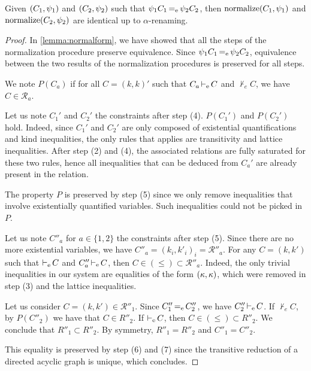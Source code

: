 \begin{lemma}[Uniqueness]
  Given $(C_1,\mathrm{\psi}_1)$ and $(C_2,\mathrm{\psi}_2)$ such that
  $\mathrm{\psi}_1 C_1 \operatorname{=_e} \mathrm{\psi}_2 C_2$, then
  $\operatorname{normalize}(C_1,\mathrm{\psi}_1)$ and $\operatorname{normalize}(C_2,\mathrm{\psi}_2)$
  are identical up to $\alpha$-renaming.
\end{lemma}
\begin{proof}
  In \cref{lemma:normalform}, we have showed that all the steps of the
  normalization procedure preserve equivalence.
  Since $\mathrm{\psi}_1 C_1 \operatorname{=_e} \mathrm{\psi}_2 C_2$, equivalence between
  the two results of the normalization procedures is preserved for all steps.

  We note $P(C_a)$ if for all $C = (k, k)'$
  such that $C_a \operatorname{\vdash_e} C$ and $\nvdash_eC$,
  we have $C \in {\mathcal R}_a$. 

  Let us note $C_1'$ and $C_2'$ the constraints after step (4). $P(C_1')$ and
  $P(C_2')$ hold. Indeed, since $C_1'$ and $C_2'$ are only composed
  of existential quantifications and kind inequalities, the only rules
  that applies are transitivity and lattice inequalities.
  After step (2) and (4), the associated relations are fully saturated for these
  two rules, hence all inequalities that can be deduced from $C_a'$ are already
  present in the relation.

  The property $P$ is preserved by step (5) since we only remove
  inequalities that involve existentially quantified variables. Such
  inequalities could not be picked in $P$.

  Let us note $C''_a$ for $a\in\{1,2\}$ the constraints after step (5).
  Since there are no more existential variables,
  we have $C''_a=(k_i,k'_i)_i=\mathcal R''_a$.
  For any $C=(k,k')$ such that $\operatorname{\vdash_e} C$ and $C''_a \operatorname{\vdash_e} C$,
  then $C \in (\leq) \subset {\mathcal R}''_a$.
  Indeed, the only trivial inequalities in our system are equalities of the form
  $(\kappa, \kappa)$, which were removed in step (3) and the lattice inequalities.

  Let us consider $C = (k,k') \in \mathcal R''_1$.
  Since $C''_1\operatorname{=_e} C''_2$, we have $C''_2 \operatorname{\vdash_e} C$.
  If $\nvdash_e{C}$, by $P(C''_2)$ we have that
  $C\in R''_2$.
  If $\operatorname{\vdash_e} C$, then $C\in (\leq) \subset R''_2$.
  We conclude that $R''_1 \subset R''_2$.
  By symmetry, $R''_1 = R''_2$ and $C''_1 = C''_2$.

  This equality is preserved by step (6) and (7)
  since the transitive reduction of a directed acyclic graph is unique,
  which concludes.
\end{proof}


